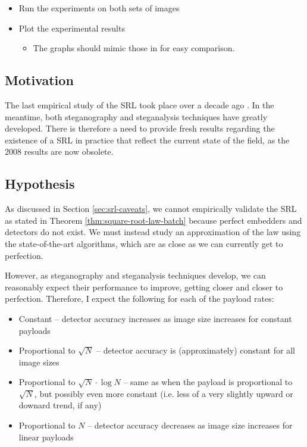 \documentclass[11pt,a4paper,twoside,openright]{report}
\begin{document}
\begin{itemize}
	\item Run the experiments on both sets of images
	
	\item Plot the experimental results
		\begin{itemize}
			\item The graphs should mimic those in \cite{2008-paper} for easy comparison.
		\end{itemize}

\end{itemize}


\subsection{Motivation}

The last empirical study of the SRL took place over a decade ago \cite{2008-paper}. In the meantime, both steganography and steganalysis techniques have greatly developed. There is therefore a need to provide fresh results regarding the existence of a SRL in practice that reflect the current state of the field, as the 2008 results are now obsolete.


\subsection{Hypothesis} \label{sec:hypothesis}

As discussed in Section \ref{sec:srl-caveats}, we cannot empirically validate the SRL as stated in Theorem \ref{thm:square-root-law-batch} because perfect embedders and detectors do not exist. We must instead study an approximation of the law using the state-of-the-art algorithms, which are as close as we can currently get to perfection.

However, as steganography and steganalysis techniques develop, we can reasonably expect their performance to improve, getting closer and closer to perfection. Therefore, I expect the following for each of the payload rates:
\begin{itemize}
	\item Constant -- detector accuracy increases as image size increases for constant payloads
	\item Proportional to $\sqrt{N}$ -- detector accuracy is (approximately) constant for all image sizes
	\item Proportional to $\sqrt{N} \cdot \log{N}$ -- same as when the payload is proportional to $\sqrt{N}$, but possibly even more constant (i.e. less of a very slightly upward or downard trend, if any)
	\item Proportional to $N$ -- detector accuracy decreases as image size increases for linear payloads
\end{itemize}
\end{document}

